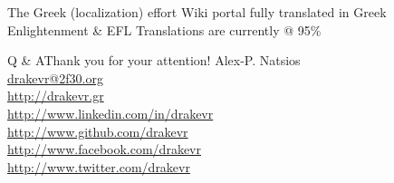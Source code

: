 \documentclass{beamer}
\begin{document}
    \begin{frame}{The Greek (localization) effort}
        Wiki portal fully translated in Greek \\
        Enlightenment \& EFL Translations are currently @ 95\%
    \end{frame}

    \begin{frame}{Q \& A}{Thank you for your attention!}
        \center Alex-P. Natsios\\
        \center\url{drakevr@2f30.org}\\
        \center\url{http://drakevr.gr}\\
        \center\url{http://www.linkedin.com/in/drakevr}\\
        \center\url{http://www.github.com/drakevr}\\
        \center\url{http://www.facebook.com/drakevr}\\
        \center\url{http://www.twitter.com/drakevr}
    \end{frame}
\end{document}
